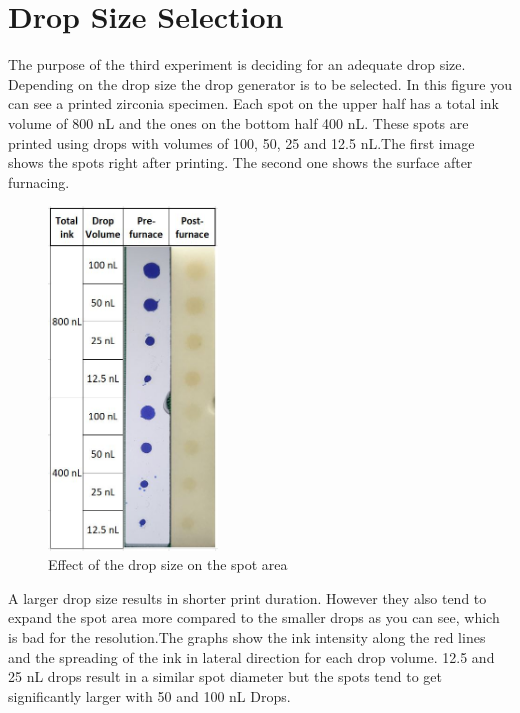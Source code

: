 \section{Drop Size Selection}
The purpose of the third experiment is deciding for an adequate drop size. Depending on the drop size the drop generator is to be selected. In this figure you can see a printed zirconia specimen. Each spot on the upper half has a total ink volume of 800 nL and the ones on the bottom half 400 nL. These spots are printed using drops with volumes of 100, 50, 25 and 12.5 nL.The first image shows the spots right after printing. The second one shows the surface after furnacing.
\begin{figure}[h]
	\centering
	\includegraphics[width=0.4\textwidth]{grafiken/DropSize.jpg}
	\caption{Effect of the drop size on the spot area}
	\label{fig:DropSize}
\end{figure} 
A larger drop size results in shorter print duration. However they also tend to expand the spot area more compared to the smaller drops as you can see, which is bad for the resolution.The graphs show the ink intensity along the red lines and the spreading of the ink in lateral direction for each drop volume. 12.5 and 25 nL drops result in a similar spot diameter but the spots tend to get significantly larger with 50 and 100 nL Drops.
